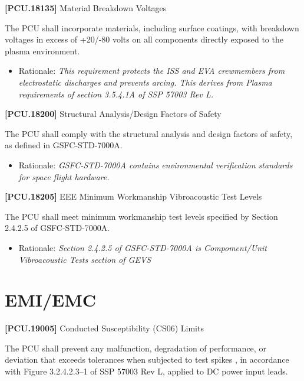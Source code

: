 \textbf{[PCU.18135]} Material Breakdown Voltages

The \gls{PCU} shall incorporate materials, including surface coatings, with breakdown voltages in excess of +20\slash -80 volts on all components directly exposed to the plasma environment.

\begin{itemize}
\item{} Rationale: \emph{This requirement protects the ISS and EVA crewmembers from electrostatic discharges and prevents arcing. This derives from Plasma requirements of section 3.5.4.1A of SSP 57003 Rev L.}

\end{itemize}

\textbf{[PCU.18200]} Structural Analysis\slash Design Factors of Safety

The \gls{PCU} shall comply with the structural analysis and design factors of safety, as defined in \gls{GSFC}-STD-7000A.

\begin{itemize}
\item{} Rationale: \emph{GSFC-STD-7000A contains environmental verification standards for space flight hardware.}

\end{itemize}

\textbf{[PCU.18205]} \gls{EE}E Minimum Workmanship Vibroacoustic Test Levels

The \gls{PCU} shall meet minimum workmanship test levels specified by Section 2.4.2.5 of \gls{GSFC}-STD-7000A.

\begin{itemize}
\item{} Rationale: \emph{Section 2.4.2.5 of GSFC-STD-7000A is Compoment\slash Unit Vibroacoustic Tests section of GEVS}

\end{itemize}

\section{EMI\slash EMC}
\label{emiemc}

\textbf{[PCU.19005]} Conducted Susceptibility (CS06) Limits

The \gls{PCU} shall prevent any malfunction, degradation of performance, or deviation that exceeds tolerances when subjected to test spikes , in accordance with Figure 3.2.4.2.3--1 of SSP 57003 Rev L, applied to DC power input leads.

